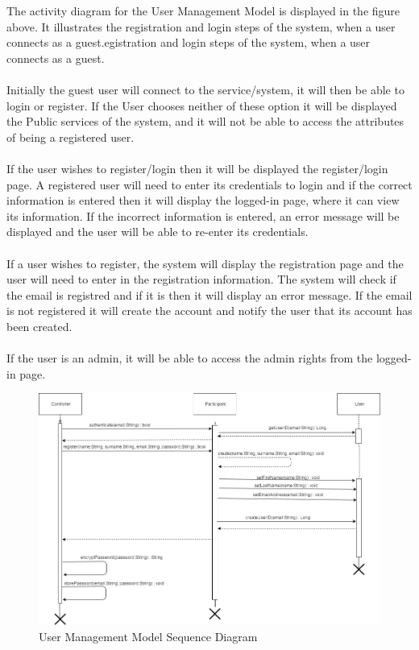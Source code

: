 \documentclass{article}
\begin{document}
			    {The activity diagram for the User Management Model is displayed in the figure above. It illustrates the registration and login steps of the system, when a user connects as a guest.egistration and login steps of the system, when a user connects as a guest. \\\\
				Initially the guest user will connect to the service/system, it will then be able to login or register. If the User chooses neither of these option it will be displayed the Public services of the system, and it will not be able to access the attributes of being a registered user.\\\\
				If the user wishes to register/login then it will be displayed the register/login page. A registered user will need to enter its credentials to login and if the correct information is entered then it will display the logged-in page, where it can view its information. If the incorrect information is entered, an error message will be displayed and the user will be able to re-enter its credentials.\\\\
				If a user wishes to register, the system will display the registration page and the user will need to enter in the registration information.  The system will check if the email is registred and if it is then it will display an error message. If the email is not registered it will create the account and notify the user that its account has been created.\\\\
				If the user is an admin, it will be able to access the admin rights from the logged-in page.}
				\begin{figure}[H]
                    \centering \includegraphics[height=0.55\textheight]{UMM-Diagrams/UMM-SequenceDiagram}
                     \caption{User Management Model Sequence Diagram}
					 \label{fig:user_sequence}
			    \end{figure}
\end{document}
